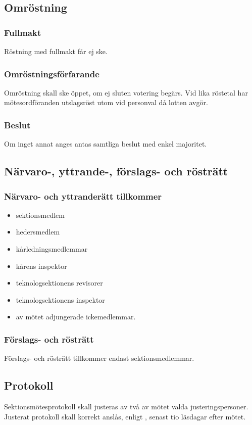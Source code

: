 \subsection{Omröstning}

\subsubsection{Fullmakt}
Röstning med fullmakt får ej ske.

\subsubsection{Omröstningsförfarande}
Omröstning skall ske öppet, om ej sluten votering begärs. Vid lika röstetal har mötesordföranden utslagsröst utom vid personval då lotten avgör.

\subsubsection{Beslut}
Om inget annat anges antas samtliga beslut med enkel majoritet.

\subsection{Närvaro-, yttrande-, förslags- och rösträtt}

\subsubsection{Närvaro- och yttranderätt tillkommer}
\begin{itemize}
	\item sektionsmedlem
	\item hedersmedlem
	\item kårledningsmedlemmar
	\item kårens inspektor
	\item teknologsektionens revisorer
	\item teknologsektionens inspektor
	\item av mötet adjungerade ickemedlemmar.
\end{itemize}

\subsubsection{Förslags- och rösträtt}
Förslags- och rösträtt tillkommer endast sektionsmedlemmar.

\subsection{Protokoll}
Sektionsmötesprotokoll skall justeras av två av mötet valda justeringspersoner. Justerat protokoll skall korrekt anslås, enligt , senast tio läsdagar efter mötet.

